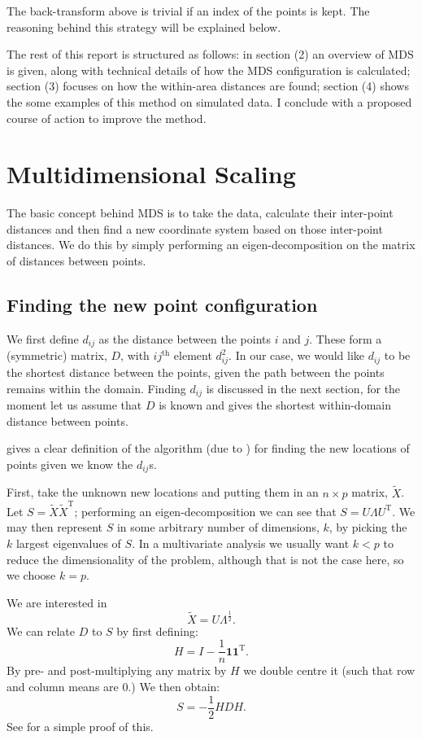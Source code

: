 \documentclass[a4paper,10pt]{article}
\newcommand{\tr}[1]{#1^{\text{T}}}
\begin{document}
The back-transform above is trivial if an index of the points is kept. The reasoning behind this strategy will be explained below.

The rest of this report is structured as follows: in section (2) an overview of MDS is given, along with technical details of how the MDS configuration is calculated; section (3) focuses on how the within-area distances are found; section (4) shows the some examples of this method on simulated data. I conclude with a proposed course of action to improve the method.

\section{Multidimensional Scaling}

The basic concept behind MDS is to take the data, calculate their inter-point distances and then find a new coordinate system based on those inter-point distances. We do this by simply performing an eigen-decomposition on the matrix of distances between points.

\subsection{Finding the new point configuration}

We first define $d_{ij}$ as the distance between the points $i$ and $j$. These form a (symmetric) matrix, $D$, with $ij^{\text{th}}$ element $d^2_{ij}$. In our case, we would like $d_{ij}$ to be the shortest distance between the points, given the path between the points remains within the domain. Finding $d_{ij}$ is discussed in the next section, for the moment let us assume that $D$ is known and gives the shortest within-domain distance between points.

\cite{diaconis08} gives a clear definition of the algorithm (due to \cite{schoenberg35}) for finding the new locations of points given we know the $d_{ij}$s. 

First, take the unknown new locations and putting them in an $n \times p$ matrix, $\tilde{X}$. Let $S=\tilde{X}\tr{\tilde{X}}$; performing an eigen-decomposition we can see that $S=U\Lambda\tr{U}$. We may then represent $S$ in some arbitrary number of dimensions, $k$, by picking the $k$ largest eigenvalues of $S$. In a multivariate analysis we usually want $k<p$ to reduce the dimensionality of the problem, although that is not the case here, so we choose $k=p$.

We are interested in
\begin{equation}
\tilde{X}=U\Lambda^{\frac{1}{2}}.
\end{equation}
We can relate $D$ to $S$ by first defining:
\begin{equation}
H = I-\frac{1}{n}\mathbf{1}\tr{\mathbf{1}}.
\end{equation}
By pre- and post-multiplying any matrix by $H$ we double centre it (such that row and column means are 0.) We then obtain:
\begin{equation}
S = -\frac{1}{2}HDH.
\end{equation}
See \cite{diaconis08} for a simple proof of this.
\end{document}
